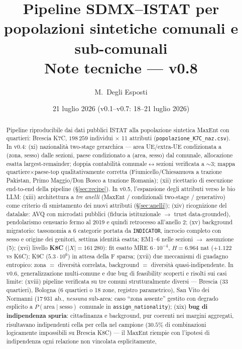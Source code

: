 \documentclass[11pt,a4paper]{article}
\title{\textbf{Pipeline SDMX--ISTAT per popolazioni sintetiche comunali e sub-comunali}\\[2mm]
\large Note tecniche --- v0.8}
\author{M.~Degli Esposti}
\date{21 luglio 2026 \quad (v0.1--v0.7: 18--21 luglio 2026)}
\newcommand{\code}[1]{\texttt{#1}}
\begin{document}
\maketitle

\begin{abstract}
\noindent
Pipeline riproducibile dai dati pubblici ISTAT alla popolazione sintetica
MaxEnt con quartieri: Brescia K7C, $198\,259$ individui $\times$ 11 attributi
(\code{popolazione\_K7C\_naz.csv}). In v0.4: (xi) nazionalit\`a two-stage
gerarchica --- area UE/extra-UE condizionata a (zona, sesso) dalle sezioni,
paese condizionato a (area, sesso) dal comunale, allocazione esatta
largest-remainder; doppia contabilit\`a comunale$\leftrightarrow$sezioni
verificata a $\sim3$\textperthousand; mappa quartiere$\times$paese-top
qualitativamente corretta (Fiumicello/Chiesanuova a trazione Pakistan,
Primo Maggio/Don Bosco a trazione Romania); (xii) ricettario di esecuzione
end-to-end della pipeline (\S\ref{sec:recipe}). In v0.5, l'espansione degli
attributi verso le bio LLM: (xiii) architettura a \emph{tre anelli}
(MaxEnt / condizionali two-stage / generativo) come criterio di smistamento
dei nuovi attributi (\S\ref{sec:anelli}); (xiv) ricognizione del datalake:
AVQ con microdati pubblici (fiducia istituzionale $\to$ trust data-grounded),
pendolarismo censuario fermo al 2019 e quindi retrocesso all'anello 2;
(xv) background migratorio: tassonomia a 6 categorie portata da
\code{INDICATOR}, incrocio completo con sesso e origine dei genitori,
settima identit\`a esatta; EM1--6 nelle sezioni $\to$ assunzione (5);
(xvi) livello \textbf{K8C} ($|X|=161\,280$): fit esatto MRE
$6\cdot10^{-4}$, $H=6.964$ nat ($+1.122$ vs K6C); K9C ($5.3\cdot10^6$)
in attesa della F sparsa; (xvii) due meccanismi di guadagno entropico:
zona $=$ diversit\`a correlata, background $=$ diversit\`a
quasi-indipendente. In v0.6, generalizzazione multi-comune e due bug di
feasibility scoperti e risolti sui casi limite: (xviii) pipeline verificata
su tre comuni strutturalmente diversi --- Brescia (33 quartieri), Bologna
(6 quartieri o 18 zone, registro parametrico), San Vito dei Normanni
(17\,931 ab., \emph{nessuna} sub-area: caso ``zona assente'' gestito con
degrado esplicito a $P(\text{area}\mid\text{sesso})$ comunale in
\code{assign\_nationality}); (xix) \textbf{bug di indipendenza spuria}:
cittadinanza e background, pur coerenti nei margini aggregati, risultavano
indipendenti cella per cella nel campione ($30.5\%$ di combinazioni
logicamente impossibili su Brescia K8C) --- il MaxEnt riempie con
l'ipotesi di indipendenza ogni relazione non vincolata esplicitamente,

\end{abstract}
\end{document}

